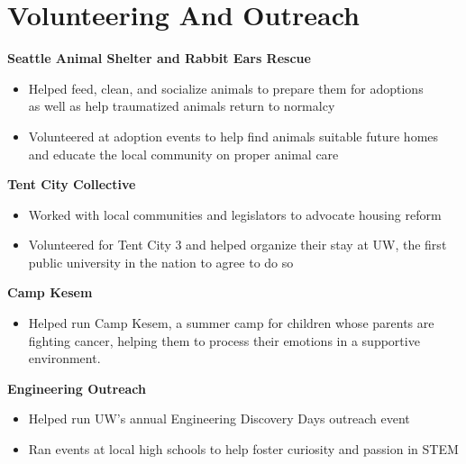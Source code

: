 \section{\sc Volunteering  And Outreach}



{\bf{Seattle Animal Shelter and Rabbit Ears Rescue}}
\begin{itemize}
\setlength\itemsep{0em}
\item[$\circ$] Helped feed, clean, and socialize animals to prepare
them for adoptions\\ as well as help traumatized animals return to normalcy
\item[$\circ$] Volunteered at adoption events to help find animals suitable future homes \\ and educate the local community on proper animal care
\end{itemize}

{\bf{Tent City Collective}}
\begin{itemize}
\setlength\itemsep{0em}
\item[$\circ$] Worked with local communities and legislators to advocate housing reform
\item[$\circ$] Volunteered for Tent City 3 and helped organize their stay at UW, the first\\ public university in the nation to agree to do so
\end{itemize}

{\bf{Camp Kesem}}
\begin{itemize}
\setlength\itemsep{0em}
\item[$\circ$] Helped run Camp Kesem, a summer camp for children whose parents are fighting cancer, helping them to process their emotions in a supportive environment.
\end{itemize}

{\bf{Engineering Outreach}}
\begin{itemize}
\setlength\itemsep{0em}
\item[$\circ$] Helped run UW's annual Engineering Discovery Days outreach event
\item[$\circ$] Ran events at local high schools to help foster curiosity and passion in STEM

\end{itemize}

